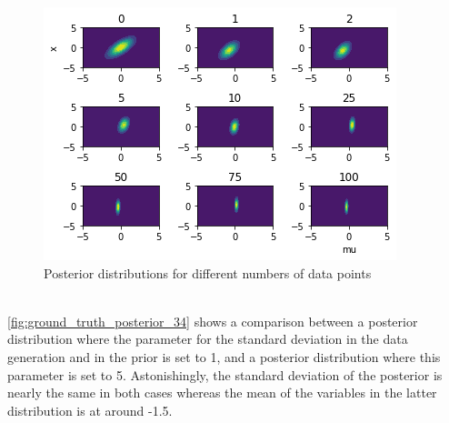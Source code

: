 \documentclass{article}
\begin{document}
\begin{figure}
	\includegraphics[width=\textwidth]{images/posterior_different_data_sizes.png}
	\caption[Posterior distributions for different numbers of data points]{Posterior distributions for different numbers of data points}
	\label{fig:posterior_different_data_sizes}
\end{figure}
\\
\autoref{fig:ground_truth_posterior_34} shows a comparison between a posterior distribution where the parameter for the standard deviation in the data generation and in the prior is set to 1, and a posterior distribution where this parameter is set to 5. Astonishingly, the standard deviation of the posterior is nearly the same in both cases whereas the mean of the variables in the latter distribution is at around -1.5.
\end{document}

